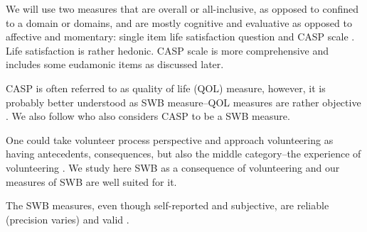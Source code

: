 \documentclass[10pt, letterpaper]{article}
\begin{document}
\begin{spacing}{1.4}
We will use two measures that are overall or all-inclusive, as opposed to
confined to a domain or domains, and are mostly cognitive and evaluative
as opposed to affective and momentary: single item life satisfaction question
and CASP scale \citep{hyde03,hyde15}. Life satisfaction is rather hedonic. CASP
scale is more comprehensive and includes some eudamonic items as discussed later.

CASP is often referred to as quality of life (QOL) measure, however, it is probably better understood as SWB measure--QOL measures are rather
objective \citep{aok13liavbility,aok-swbLivability18}. We also follow
\citet{vanhoutte12,vanhoutte14} who also considers CASP to be a SWB measure.

One could take volunteer process perspective and approach volunteering
as having antecedents, consequences, but also the middle category--the
experience of volunteering \citep{wilson12B}. We study here SWB as a consequence
of volunteering and our measures of SWB are well suited for it.



The SWB measures, even though self-reported and
 subjective, are  reliable (precision varies) %
 and valid \citep{myers00,ditella06m,diener09}. 



\end{spacing}
\end{document}
